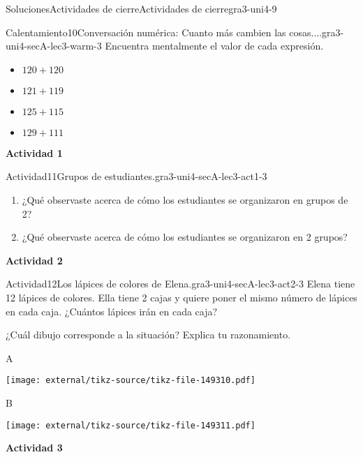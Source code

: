 \documentclass[twoside,10pt,]{article}
\begin{document}
\begin{solutions-section}{Soluciones}{Actividades de cierre}{}{Actividades de cierre}{}{}{gra3-uni4-9}
\begin{explorationsolution}{Calentamiento}{10}{Conversación numérica: Cuanto más cambien las cosas....}{gra3-uni4-secA-lec3-warm-3}
Encuentra mentalmente el valor de cada expresión.%
\par
%
\begin{itemize}[label=\textbullet]
\item{}\(\displaystyle 120 + 120\)%
\item{}\(\displaystyle 121 + 119\)%
\item{}\(\displaystyle 125 + 115\)%
\item{}\(\displaystyle 129 + 111\)%
\end{itemize}
%
\end{explorationsolution}%
\par\medskip
\noindent\textbf{\large{}\space\textperiodcentered\space{}Actividad 1}
\begin{activitysolution}{Actividad}{11}{Grupos de estudiantes.}{gra3-uni4-secA-lec3-act1-3}%
%
\begin{enumerate}
\item{}¿Qué observaste acerca de cómo los estudiantes se organizaron en grupos de 2?%
\item{}¿Qué observaste acerca de cómo los estudiantes se organizaron en 2 grupos?%
\end{enumerate}
%
\end{activitysolution}%
\par\medskip
\noindent\textbf{\large{}\space\textperiodcentered\space{}Actividad 2}
\begin{activitysolution}{Actividad}{12}{Los lápices de colores de Elena.}{gra3-uni4-secA-lec3-act2-3}%
Elena tiene 12 lápices de colores. Ella tiene 2 cajas y quiere poner el mismo número de lápices en cada caja. ¿Cuántos lápices irán en cada caja?%
\par
¿Cuál dibujo corresponde a la situación? Explica tu razonamiento.%
\begin{sidebyside}{2}{0}{0}{0}%
\begin{sbspanel}{0.5}%
A%
\par
\texttt{[image: external/tikz-source/tikz-file-149310.pdf]}
\end{sbspanel}%
\begin{sbspanel}{0.5}%
B%
\par
\texttt{[image: external/tikz-source/tikz-file-149311.pdf]}
\end{sbspanel}%
\end{sidebyside}%
\end{activitysolution}%
\par\medskip
\noindent\textbf{\large{}\space\textperiodcentered\space{}Actividad 3}

\end{solutions-section}
\end{document}
